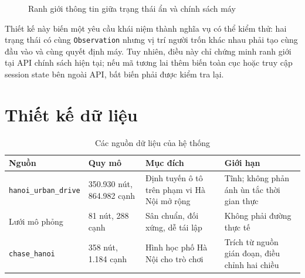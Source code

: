 \begin{figure}[H]
\centering
{}
\caption{Ranh giới thông tin giữa trạng thái ẩn và chính sách máy}
\label{fig:information-boundary}
\end{figure}

Thiết kế này biến một yêu cầu khái niệm thành nghĩa vụ có thể kiểm thử: hai trạng
thái có cùng \texttt{Observation} nhưng vị trí người trốn khác nhau phải tạo cùng
đầu vào và cùng quyết định máy. Tuy nhiên, điều này chỉ chứng minh ranh giới tại
API chính sách hiện tại; nếu mã tương lai thêm biến toàn cục hoặc truy cập session
state bên ngoài API, bất biến phải được kiểm tra lại.

\section{Thiết kế dữ liệu}

\begin{table}[H]
\centering
\caption{Các nguồn dữ liệu của hệ thống}
\begin{tabularx}{\linewidth}{p{4.0cm}p{2.3cm}Y Y}
\toprule
\textbf{Nguồn} & \textbf{Quy mô} & \textbf{Mục đích} & \textbf{Giới hạn} \\
\midrule
\texttt{hanoi\_urban\_drive} & 350.930 nút, 864.982 cạnh & Định tuyến ô tô trên
phạm vi Hà Nội mở rộng & Tĩnh; không phản ánh ùn tắc thời gian thực \\
Lưới mô phỏng & 81 nút, 288 cạnh & Sân chuẩn, đối xứng, dễ tái lập & Không phải
đường thực tế \\
\texttt{chase\_hanoi} & 358 nút, 1.184 cạnh & Hình học phố Hà Nội cho trò chơi &
Trích từ nguồn gián đoạn, điều chỉnh hai chiều \\
\bottomrule
\end{tabularx}
\end{table}

